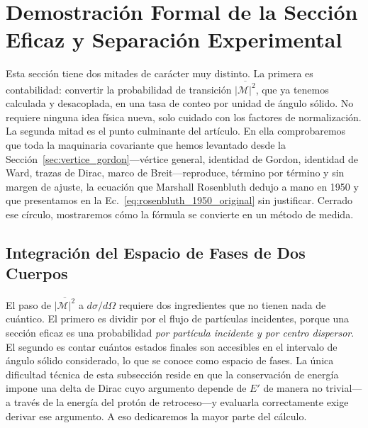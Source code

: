 \documentclass[10pt,a4paper]{article}
\begin{document}
\section{Demostración Formal de la Sección Eficaz y Separación Experimental}
\label{sec:seccion_rosenbluth}

Esta sección tiene dos mitades de carácter muy distinto. La primera es contabilidad: convertir la probabilidad de transición $\overline{|\mathcal{M}|^2}$, que ya tenemos calculada y desacoplada, en una tasa de conteo por unidad de ángulo sólido. No requiere ninguna idea física nueva, solo cuidado con los factores de normalización. La segunda mitad es el punto culminante del artículo. En ella comprobaremos que toda la maquinaria covariante que hemos levantado desde la Sección~\ref{sec:vertice_gordon}---vértice general, identidad de Gordon, identidad de Ward, trazas de Dirac, marco de Breit---reproduce, término por término y sin margen de ajuste, la ecuación que Marshall Rosenbluth dedujo a mano en 1950 y que presentamos en la Ec.~\eqref{eq:rosenbluth_1950_original} sin justificar. Cerrado ese círculo, mostraremos cómo la fórmula se convierte en un método de medida.

\subsection{Integración del Espacio de Fases de Dos Cuerpos}
El paso de $\overline{|\mathcal{M}|^2}$ a $d\sigma/d\Omega$ requiere dos ingredientes que no tienen nada de cuántico. El primero es dividir por el flujo de partículas incidentes, porque una sección eficaz es una probabilidad \emph{por partícula incidente y por centro dispersor}. El segundo es contar cuántos estados finales son accesibles en el intervalo de ángulo sólido considerado, lo que se conoce como espacio de fases. La única dificultad técnica de esta subsección reside en que la conservación de energía impone una delta de Dirac cuyo argumento depende de $E'$ de manera no trivial---a través de la energía del protón de retroceso---y evaluarla correctamente exige derivar ese argumento. A eso dedicaremos la mayor parte del cálculo.
\end{document}
